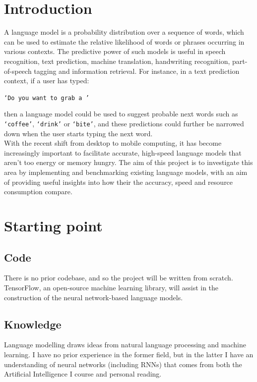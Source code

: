 \documentclass[a4paper, 12pt]{article}
\newcommand{\ttt}[1]{\texttt{#1}}
\begin{document}
\section*{Introduction}
A language model is a probability distribution over a sequence of words, which can be used to estimate the relative likelihood of words or phrases occurring in various contexts. The predictive power of such models is useful in speech recognition, text prediction, machine translation, handwriting recognition, part-of-speech tagging and information retrieval. For instance, in a text prediction context, if a user has typed:

\begin{center}
	\ttt{`Do you want to grab a '}
\end{center}

\noindent
then a language model could be used to suggest probable next words such as \ttt{`coffee'}, \ttt{`drink'} or \ttt{`bite'}, and these predictions could further be narrowed down when the user starts typing the next word. \\

\noindent
With the recent shift from desktop to mobile computing, it has become increasingly important to facilitate accurate, high-speed language models that aren't too energy or memory hungry. The aim of this project is to investigate this area by implementing and benchmarking existing language models, with an aim of providing useful insights into how their the accuracy, speed and resource consumption compare.

\section*{Starting point}

\subsection*{Code}
There is no prior codebase, and so the project will be written from scratch. TensorFlow, an open-source machine learning library, will assist in the construction of the neural network-based language models.

\subsection*{Knowledge}
Language modelling draws ideas from natural language processing and machine learning. I have no prior experience in the former field, but in the latter I have an understanding of neural networks (including RNNs) that comes from both the Artificial Intelligence I course and personal reading. \\
\end{document}
